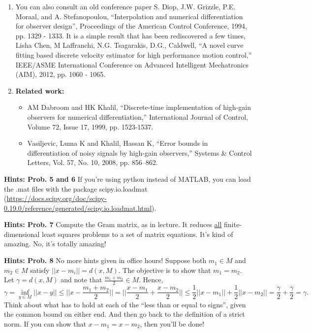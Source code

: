 \documentclass[letterpaper]{article}
\begin{document}
\begin{enumerate}
\item You can also consult an old conference paper S. Diop, J.W.  Grizzle, P.E. Moraal, and A. Stefanopoulou, ``Interpolation and numerical differentiation for observer design'', Proceedings of the American Control Conference, 1994, pp. 1329	- 1333.  It is  a simple result that has been rediscovered a few times, Lisha Chen, M Laffranchi, N.G. Tsagarakis,   D.G., Caldwell, ``A novel curve fitting based discrete velocity estimator for high performance motion control,''  IEEE/ASME International Conference on Advanced Intelligent Mechatronics (AIM), 2012, pp. 1060 - 1065.

    \item \textbf{Related work:} \begin{itemize}

    \item AM Dabroom and HK Khalil, ``Discrete-time implementation of high-gain observers for numerical differentiation,'' International Journal of Control, Volume 72, Issue 17, 1999, pp. 1523-1537.

        \item Vasiljevic, Luma K and Khalil, Hassan K, ``Error bounds in differentiation of noisy signals by high-gain observers,''
Systems \& Control Letters, Vol. 57, No. 10, 2008, pp. 856--862.

\end{itemize}

\end{enumerate}
\vspace{1cm}

\noindent \textbf{Hints: Prob. 5 and 6} If you're using python instead of MATLAB, you can load the .mat files with the package scipy.io.loadmat (\url{https://docs.scipy.org/doc/scipy-0.19.0/reference/generated/scipy.io.loadmat.html}).

\vspace{1cm}

\noindent \textbf{Hints: Prob. 7} Compute the Gram matrix, as in lecture. It reduces \underline{all} finite-dimensional least squares problems to a set of matrix equations. It's kind of amazing. No, it's totally amazing!

\vspace{1cm}

\noindent \textbf{Hints: Prob. 8}  No more hints given in office hours! Suppose both $m_1\in M$ and $m_2\in M$ satisfy $||x-m_i||=d(x,M)$. The objective is to show that $m_1 = m_2$. Let $\gamma = d(x,M)$ and note that $\frac{m_1+m_2}{2}\in M$. Hence,
$$ \gamma =\inf_{y\in M} ||x-y|| \le || x -\frac{m_1+m_2}{2} || = ||\frac{x-m_1}{2} +\frac{x-m_2}{2} || \le \frac{1}{2} ||x-m_1|| + \frac{1}{2} ||x-m_2|| = \frac{\gamma}{2} + \frac{\gamma}{2} = \gamma.$$  Think about what has to hold at each of the ``less than or equal to signs'', given the common bound on either end. And then go back to the definition of a strict norm. If you can show that $x-m_1 = x-m_2$, then you'll be done!\\
\end{document}

